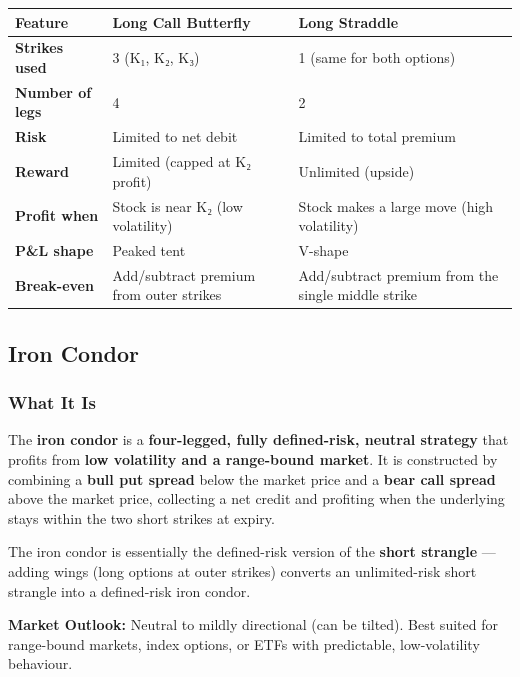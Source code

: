 \documentclass[12pt,openany]{book}
\begin{document}
\begin{center}
\scriptsize
\setlength{\tabcolsep}{3pt}
\begin{tabular}{|L{4.42cm}|L{4.42cm}|L{4.42cm}|}
\hline
Feature & Long Call Butterfly & Long Straddle \\
\hline
\textbf{Strikes used} & 3 (K₁, K₂, K₃) & 1 (same for both options) \\
\hline
\textbf{Number of legs} & 4 & 2 \\
\hline
\textbf{Risk} & Limited to net debit & Limited to total premium \\
\hline
\textbf{Reward} & Limited (capped at K₂ profit) & Unlimited (upside) \\
\hline
\textbf{Profit when} & Stock is near K₂ (low volatility) & Stock makes a large move (high volatility) \\
\hline
\textbf{P\&L shape} & Peaked tent & V-shape \\
\hline
\textbf{Break-even} & Add/subtract premium from outer strikes & Add/subtract premium from the single middle strike \\
\hline
\end{tabular}
\end{center}



\subsection{Iron Condor}

\subsubsection{What It Is}

The \textbf{iron condor} is a \textbf{four-legged, fully defined-risk, neutral strategy} that profits from \textbf{low volatility and a range-bound market}. It is constructed by combining a \textbf{bull put spread} below the market price and a \textbf{bear call spread} above the market price, collecting a net credit and profiting when the underlying stays within the two short strikes at expiry.

The iron condor is essentially the defined-risk version of the \textbf{short strangle} — adding wings (long options at outer strikes) converts an unlimited-risk short strangle into a defined-risk iron condor.

\textbf{Market Outlook:} Neutral to mildly directional (can be tilted). Best suited for range-bound markets, index options, or ETFs with predictable, low-volatility behaviour.
\end{document}
